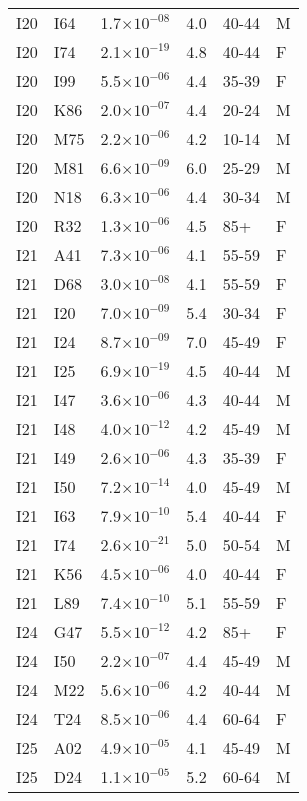 \begin{longtable}{lllrll}
   I20 & I64 & 1.7$\times10^{-08}$ & 4.0 & 40-44 & M \\ 
   I20 & I74 & 2.1$\times10^{-19}$ & 4.8 & 40-44 & F \\ 
   I20 & I99 & 5.5$\times10^{-06}$ & 4.4 & 35-39 & F \\ 
   I20 & K86 & 2.0$\times10^{-07}$ & 4.4 & 20-24 & M \\ 
   I20 & M75 & 2.2$\times10^{-06}$ & 4.2 & 10-14 & M \\ 
   I20 & M81 & 6.6$\times10^{-09}$ & 6.0 & 25-29 & M \\ 
   I20 & N18 & 6.3$\times10^{-06}$ & 4.4 & 30-34 & M \\ 
   I20 & R32 & 1.3$\times10^{-06}$ & 4.5 & 85+ & F \\ 
   I21 & A41 & 7.3$\times10^{-06}$ & 4.1 & 55-59 & F \\ 
   I21 & D68 & 3.0$\times10^{-08}$ & 4.1 & 55-59 & F \\ 
   I21 & I20 & 7.0$\times10^{-09}$ & 5.4 & 30-34 & F \\ 
   I21 & I24 & 8.7$\times10^{-09}$ & 7.0 & 45-49 & F \\ 
   I21 & I25 & 6.9$\times10^{-19}$ & 4.5 & 40-44 & M \\ 
   I21 & I47 & 3.6$\times10^{-06}$ & 4.3 & 40-44 & M \\ 
   I21 & I48 & 4.0$\times10^{-12}$ & 4.2 & 45-49 & M \\ 
   I21 & I49 & 2.6$\times10^{-06}$ & 4.3 & 35-39 & F \\ 
   I21 & I50 & 7.2$\times10^{-14}$ & 4.0 & 45-49 & M \\ 
   I21 & I63 & 7.9$\times10^{-10}$ & 5.4 & 40-44 & F \\ 
   I21 & I74 & 2.6$\times10^{-21}$ & 5.0 & 50-54 & M \\ 
   I21 & K56 & 4.5$\times10^{-06}$ & 4.0 & 40-44 & F \\ 
   I21 & L89 & 7.4$\times10^{-10}$ & 5.1 & 55-59 & F \\ 
   I24 & G47 & 5.5$\times10^{-12}$ & 4.2 & 85+ & F \\ 
   I24 & I50 & 2.2$\times10^{-07}$ & 4.4 & 45-49 & M \\ 
   I24 & M22 & 5.6$\times10^{-06}$ & 4.2 & 40-44 & M \\ 
   I24 & T24 & 8.5$\times10^{-06}$ & 4.4 & 60-64 & F \\ 
   I25 & A02 & 4.9$\times10^{-05}$ & 4.1 & 45-49 & M \\ 
   I25 & D24 & 1.1$\times10^{-05}$ & 5.2 & 60-64 & M \\ 

\end{longtable}
